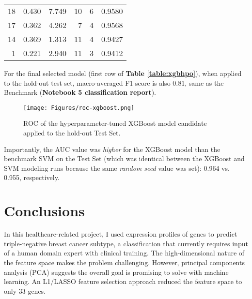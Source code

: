 \documentclass[11pt]{diazessay}
\begin{document}
\begin{table}[h]
\begin{tabular}{@{}rrrrrr@{}}
		18                                     & 0.430                            & 7.749                              & 10                                      & 6                                               & 0.9580                                           \\
		17                                     & 0.362                            & 4.262                              & 7                                       & 4                                               & 0.9568                                           \\
		14                                     & 0.369                            & 1.313                              & 11                                      & 4                                               & 0.9427                                           \\
		1                                      & 0.221                            & 2.940                              & 11                                      & 3                                               & 0.9412                                           \\ \bottomrule
	\end{tabular}
\end{table}

For the final selected model (first row of \textbf{Table \ref{table:xgbhpo}}), when applied to the hold-out test set, macro-averaged F1 score is also 0.81, same as the Benchmark (\textbf{Notebook 5 classification report}). \\

\begin{figure}[h]
	\centering
	\caption{ROC of the hyperparameter-tuned XGBoost model candidate applied to the hold-out Test Set.}
	\label{fig:svm}
	\texttt{[image: Figures/roc-xgboost.png]}
\end{figure}

Importantly, the AUC value was \textit{higher} for the XGBoost model than the benchmark SVM on the Test Set (which was identical between the XGBoost and SVM modeling runs because the same \textit{random seed} value was set): 0.964 vs. 0.955, respectively.

\section{Conclusions}

In this healthcare-related project, I used expression profiles of genes to predict triple-negative breast cancer subtype, a classification that currently requires input of a human domain expert with clinical training. The high-dimensional nature of the feature space makes the problem challenging. However, principal components analysis (PCA) suggests the overall goal is promising to solve with machine learning. An L1/LASSO feature selection approach reduced the feature space to only 33 genes. \\
\end{document}
